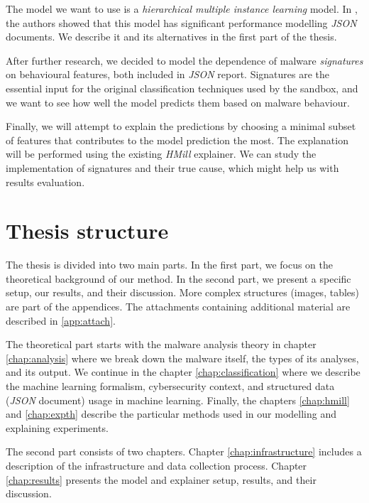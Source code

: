 The model we want to use is a \emph{hierarchical multiple instance learning} model. In \cite{Mandlik2020}, the authors showed that this model has significant performance modelling \emph{JSON} documents. We describe it and its alternatives in the first part of the thesis. 

After further research, we decided to model the dependence of malware \emph{signatures} on behavioural features, both included in \emph{JSON} report. Signatures are the essential input for the original classification techniques used by the sandbox, and we want to see how well the model predicts them based on malware behaviour.

Finally, we will attempt to explain the predictions by choosing a minimal subset of features that contributes to the model prediction the most. The explanation will be performed using the existing \emph{HMill} explainer. We can study the implementation of signatures and their true cause, which might help us with results evaluation.

\section*{Thesis structure}
The thesis is divided into two main parts. In the first part, we focus on the theoretical background of our method. In the second part, we present a specific setup, our results, and their discussion. More complex structures (images, tables) are part of the appendices. The attachments containing additional material are described in \ref{app:attach}.

The theoretical part starts with the malware analysis theory in chapter \ref{chap:analysis} where we break down the malware itself, the types of its analyses, and its output. We continue in the chapter \ref{chap:classification} where we describe the machine learning formalism, cybersecurity context, and structured data (\emph{JSON} document) usage in machine learning. Finally, the chapters \ref{chap:hmill} and \ref{chap:expth} describe the particular methods used in our modelling and explaining experiments.

The second part consists of two chapters. Chapter \ref{chap:infrastructure} includes a description of the infrastructure and data collection process. Chapter \ref{chap:results} presents the model and explainer setup, results, and their discussion.






